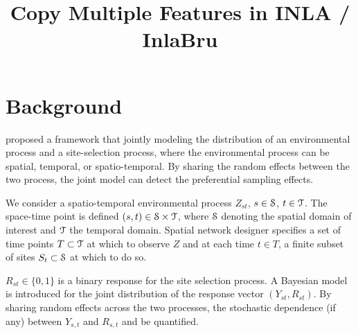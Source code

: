\documentclass{article}
\title{Copy Multiple Features in INLA / InlaBru}
\begin{document}
\maketitle

\section{Background}
\cite{Watson2019_pref_samp} proposed a framework that jointly modeling the distribution of an
environmental process and a site-selection process, where the environmental process can be spatial,
temporal, or spatio-temporal. By sharing the random effects between the two process, the joint
model can detect the preferential sampling effects.

We consider a spatio-temporal environmental process $Z_{st}$, $s\in \mathcal{S}$, $t\in \mathcal{T}$.
The space-time point is defined $(s, t) \in \mathcal{S} \times \mathcal{T}$, where $\mathcal{S}$ denoting the spatial 
domain of interest and $\mathcal{T}$ the temporal domain. 
Spatial network designer specifies a set of time points $T \subset \mathcal{T}$ at which to observe
$Z$ and at each time $t \in T$, a finite subset of sites $S_t \subset \mathcal{S}$ at which to do so.

$R_{st} \in \{0, 1\}$ is a binary response for the site selection process.
A Bayesian model is introduced for the joint distribution of the response vector $(Y_{st}, R_{st})$.
By sharing random effects across the two processes, the stochastic dependence (if any) between 
$Y_{s, t}$ and $R_{s, t}$ and be quantified.
\end{document}
